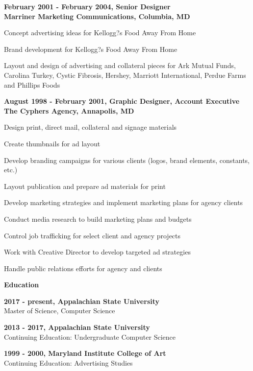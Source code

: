 \documentclass[a4paper,12pt,final]{memoir}
\newcommand{\Sep}{\vspace{1.5em}}
\newcommand{\SmallSep}{\vspace{0.5em}}
\newcommand{\CVSection}[1]
	{\Large\textbf{#1}\par
	\SmallSep\normalsize\normalfont}
\newcommand{\CVItem}[1]
	{\textbf{\color{BrickRed} #1}}
\begin{document}
\CVItem{February 2001 - February 2004, Senior Designer\\
Marriner Marketing Communications, Columbia, MD}
\begin{compactitem}[\color{BrickRed}$\circ$]
	\item Concept advertising ideas for Kellogg?s Food Away From Home
	\item Brand development for Kellogg?s Food Away From Home
	\item Layout and design of advertising and collateral pieces for Ark Mutual Funds, Carolina Turkey, Cystic Fibrosis, Hershey, Marriott International, Perdue Farms and Phillips Foods
\end{compactitem}
\SmallSep

\CVItem{August 1998 - February 2001, Graphic Designer, Account Executive\\
The Cyphers Agency, Annapolis, MD}
\begin{compactitem}[\color{BrickRed}$\circ$]
	\item Design print, direct mail, collateral and signage materials
	\item Create thumbnails for ad layout
	\item Develop branding campaigns for various clients (logos, brand elements, constants, etc.)
	\item Layout publication and prepare ad materials for print
	\item Develop marketing strategies and implement marketing plans for agency clients
	\item Conduct media research to build marketing plans and budgets
	\item Control job trafficking for select client and agency projects
	\item Work with Creative Director to develop targeted ad strategies
	\item Handle public relations efforts for agency and clients
\end{compactitem}
\SmallSep

\Sep

\CVSection{Education}
\CVItem{2017 - present, Appalachian State University}\\
Master of Science, Computer Science
\SmallSep

\CVItem{2013 - 2017, Appalachian State University}\\
Continuing Education: Undergraduate Computer Science
\SmallSep

\CVItem{1999 - 2000, Maryland Institute College of Art}\\
Continuing Education: Advertising Studies
\SmallSep
\end{document}
